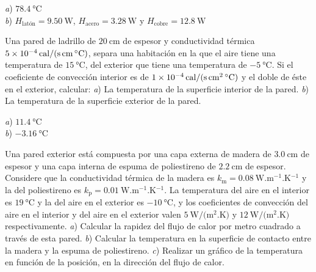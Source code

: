 \begin{Answer}
	\begin{minipage}[t]{.4\textwidth}
    \textit{a}) $\SI{78.4}{\celsius}$\\ \textit{b}) $H_\text{latón} = \SI{9.50}{\watt}$, $H_\text{acero} = \SI{3.28}{\watt}$ y $H_\text{cobre} = \SI{12.8}{\watt}$
  \end{minipage}
\end{Answer}
%
\begin{Exercise}
  Una pared de ladrillo de $\SI{20}{\centi\metre}$ de espesor y conductividad térmica $\SI{5E-4}{cal/(\second.\centi\metre.\celsius)}$, separa una habitación en la que el aire tiene una temperatura de $\SI{15}{\celsius}$, del exterior que tiene una temperatura de $\SI{-5}{\celsius}$. Si el coeficiente de convección interior es de $\SI{1E-4}{cal/(\second.\centi\square\metre.\celsius)}$ y el doble de  éste en el exterior, calcular: \textit{a}) La temperatura de la superficie interior de la pared. \textit{b}) La temperatura de la superficie exterior de la pared.
\end{Exercise}
\begin{Answer}
  \begin{minipage}[t]{.4\textwidth}
    \textit{a}) $\SI{11.4}{\celsius}$\\ \textit{b}) $\SI{-3.16}{\celsius}$
  \end{minipage}
\end{Answer}
%
\begin{Exercise}\label{p:transmision01}
  Una pared exterior está compuesta por una capa externa de madera de $\SI{3.0}{\centi\metre}$ de espesor y una capa interna de espuma de poliestireno de $\SI{2.2}{\centi\metre}$ de espesor. Considere que la conductividad térmica de la madera es $k_\text{m} = \SI{0.08}{\watt.\metre^{-1}.\kelvin^{-1}}$ y la del poliestireno es $k_\text{p} = \SI{0.01}{\watt.\metre^{-1}.\kelvin^{-1}}$. La temperatura del aire en el interior es $\SI{19}{\celsius}$ y la del aire en el exterior es $\SI{-10}{\celsius}$, y los coeficientes de convección del aire en el interior y del aire en el exterior valen $\SI{5}{\watt/(\square\metre.\kelvin)}$ y $\SI{12}{\watt/(\square\metre.\kelvin)}$ respectivamente. \textit{a}) Calcular la rapidez del flujo de calor por metro cuadrado a través de esta pared. \textit{b}) Calcular la temperatura en la superficie de contacto entre la madera y la espuma de poliestireno. \textit{c}) Realizar un gráfico de la temperatura en función de la posición, en la dirección del flujo de calor.
\end{Exercise}

